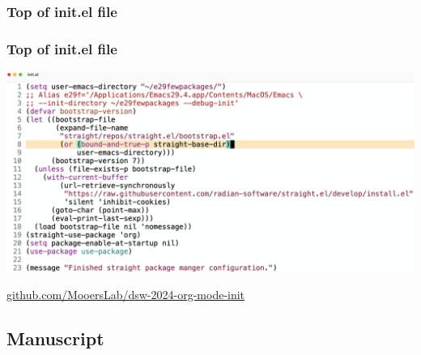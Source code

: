 \documentclass[aspectratio=169]{beamer}
\begin{document}
\subsubsection{Top of init.el file}
\begin{frame}
\frametitle{Top of init.el file }
\begin{center}
    \includegraphics[scale=0.25]{Figures/initFile.png}
\end{center}
\url{github.com/MooersLab/dsw-2024-org-mode-init}
\end{frame}


\subsection{Manuscript}

\end{document}
